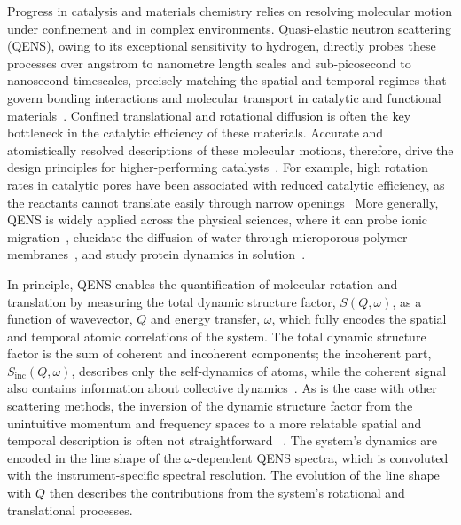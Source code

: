 \documentclass[reprint,
               superscriptaddress,
               nobibnotes,
               amsmath,
               amssymb,
               aps,
               hidelinks, 
               pre]{revtex4-2}
\makeatletter
\def\maketitle{
\@author@finish
\title@column\titleblock@produce
\suppressfloats[t]}
\makeatother
\begin{document}
\maketitle


Progress in catalysis and materials chemistry relies on resolving molecular motion under confinement and in complex environments. 
Quasi-elastic neutron scattering (QENS), owing to its exceptional sensitivity to hydrogen, directly probes these processes over angstrom to nanometre length scales and sub-picosecond to nanosecond timescales, precisely matching the spatial and temporal regimes that govern bonding interactions and molecular transport in catalytic and functional materials~\cite{OMalley2016, Han2024, Jobic2000}.
Confined translational and rotational diffusion is often the key bottleneck in the catalytic efficiency of these materials. 
Accurate and atomistically resolved descriptions of these molecular motions, therefore, drive the design principles for higher-performing catalysts~\cite{Kolokolov2017}.
For example, high rotation rates in catalytic pores have been associated with reduced catalytic efficiency, as the reactants cannot translate easily through narrow openings~\cite{Dunn2024}
More generally, QENS is widely applied across the physical sciences, where it can probe ionic migration~\cite{Schwaighofer2025}, elucidate the diffusion of water through microporous polymer membranes~\cite{Wang2024}, and study protein dynamics in solution~\cite{Sarter2024}. 

In principle, QENS enables the quantification of molecular rotation and translation by measuring the total dynamic structure factor, $S(Q,\omega)$, as a function of wavevector, $Q$ and energy transfer, $\omega$, which fully encodes the spatial and temporal atomic correlations of the system.
The total dynamic structure factor is the sum of coherent and incoherent components; the incoherent part, $S_{\mathrm{inc}}(Q, \omega)$, describes only the self-dynamics of atoms, while the coherent signal also contains information about collective dynamics~\cite{Sarter2024, Burankova2014}. 
As is the case with other scattering methods, the inversion of the dynamic structure factor from the unintuitive momentum and frequency spaces to a more relatable spatial and temporal description is often not straightforward ~\cite {Morton2025}. 
The system's dynamics are encoded in the line shape of the $\omega$-dependent QENS spectra, which is convoluted with the instrument-specific spectral resolution.
The evolution of the line shape with $Q$ then describes the contributions from the system's rotational and translational processes. 
\end{document}

